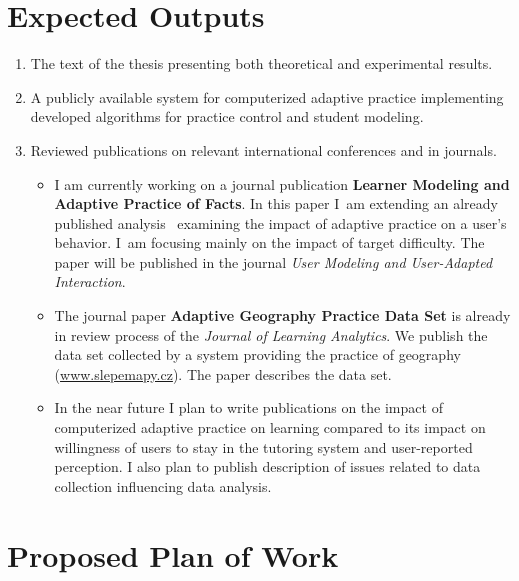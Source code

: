 \documentclass[table,color,cover,twoside,nolot,nolof]{fithesis3/fithesis3}
\begin{document}
\section{Expected Outputs}
\begin{enumerate}
	\item The text of the thesis presenting both theoretical and experimental
		results.
	\item A publicly available system for computerized adaptive practice
		implementing developed algorithms for practice control and student
		modeling.
	\item Reviewed publications on relevant international conferences and in
		journals.
		\begin{itemize}
			\item I am currently working on a journal publication
				\textbf{Learner Modeling and Adaptive Practice of Facts}. In this paper
				I~am extending an already published analysis~\cite{papousek2015impact}
				examining the impact of adaptive practice on a user's behavior. I~am
				focusing mainly on the impact of target difficulty. The paper will be
				published in the journal \emph{User Modeling and User-Adapted Interaction}.
			\item The journal paper \textbf{Adaptive Geography Practice Data Set} is
				already in review process of the \emph{Journal of Learning Analytics}.
				We publish the data set collected by a system providing
				the practice of geography (\url{www.slepemapy.cz}).
				The paper describes the data set.
			\item In the near future I plan to write publications on the impact of computerized
				adaptive practice on learning compared to its impact on willingness of
				users to stay in the tutoring system and user-reported perception. I
				also plan to publish description of issues related to data collection
				influencing data analysis.
		\end{itemize}
\end{enumerate}



\section{Proposed Plan of Work}
\end{document}
